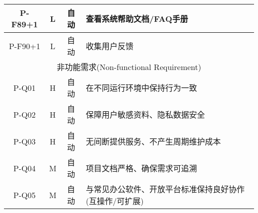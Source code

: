 \begin{longtable}{|c|c|c|X|}
  P-F89+1 & L & 自动 & 查看系统帮助文档/FAQ手册 \\ \hline
  P-F90+1 & L & 自动 & 收集用户反馈 \\ \hline
  \multicolumn{4}{|c|}{非功能需求(Non-functional Requirement)} \\ \hline
  P-Q01   & H & 自动 & 在不同运行环境中保持行为一致 \\ \hline
  P-Q02   & H & 自动 & 保障用户敏感资料、隐私数据安全 \\ \hline
  P-Q03   & H & 自动 & 无间断提供服务、不产生周期维护成本 \\ \hline
  P-Q04   & M & 自动 & 项目文档严格、确保需求可追溯 \\ \hline
  P-Q05   & M & 自动 & 与常见办公软件、开放平台标准保持良好协作(互操作/可扩展) \\ \hline
\end{longtable}
